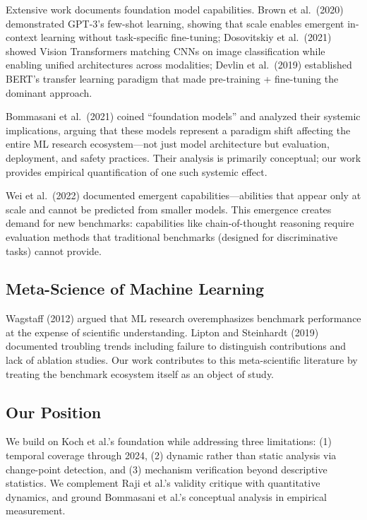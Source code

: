 Extensive work documents foundation model capabilities. Brown et al.\ (2020) demonstrated GPT-3's few-shot learning, showing that scale enables emergent in-context learning without task-specific fine-tuning; Dosovitskiy et al.\ (2021) showed Vision Transformers matching CNNs on image classification while enabling unified architectures across modalities; Devlin et al.\ (2019) established BERT's transfer learning paradigm that made pre-training + fine-tuning the dominant approach.

Bommasani et al.\ (2021) coined ``foundation models'' and analyzed their systemic implications, arguing that these models represent a paradigm shift affecting the entire ML research ecosystem---not just model architecture but evaluation, deployment, and safety practices. Their analysis is primarily conceptual; our work provides empirical quantification of one such systemic effect.

Wei et al.\ (2022) documented emergent capabilities---abilities that appear only at scale and cannot be predicted from smaller models. This emergence creates demand for new benchmarks: capabilities like chain-of-thought reasoning require evaluation methods that traditional benchmarks (designed for discriminative tasks) cannot provide.

\subsection{Meta-Science of Machine Learning}

Wagstaff (2012) argued that ML research overemphasizes benchmark performance at the expense of scientific understanding. Lipton and Steinhardt (2019) documented troubling trends including failure to distinguish contributions and lack of ablation studies. Our work contributes to this meta-scientific literature by treating the benchmark ecosystem itself as an object of study.

\subsection{Our Position}

We build on Koch et al.'s foundation while addressing three limitations: (1) temporal coverage through 2024, (2) dynamic rather than static analysis via change-point detection, and (3) mechanism verification beyond descriptive statistics. We complement Raji et al.'s validity critique with quantitative dynamics, and ground Bommasani et al.'s conceptual analysis in empirical measurement.
